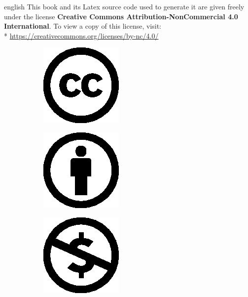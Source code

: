 \documentclass[0_Main.tex]{subfiles}
\begin{document}
\begin{shownto}{english}
This book and its Latex source code used to generate it are given freely under the license \textbf{Creative Commons Attribution-NonCommercial 4.0 International}. To view a copy of this license, visit:\\* \href{https://creativecommons.org/licenses/by-nc/4.0/}{https://creativecommons.org/licenses/by-nc/4.0/}
\end{shownto}

\begin{figure}[H]
\def\W{0.19}
\centering
\begin{subfigure}[b]{\W\columnwidth}
	\centering
	\includegraphics{pics/cc.eps}
\end{subfigure}
\begin{subfigure}[b]{\W\columnwidth}
	\centering
	\includegraphics{pics/by.eps}
\end{subfigure}
\begin{subfigure}[b]{\W\columnwidth}
	\centering
	\includegraphics{pics/nc.eps}
\end{subfigure}		
\end{figure}
\end{document}
